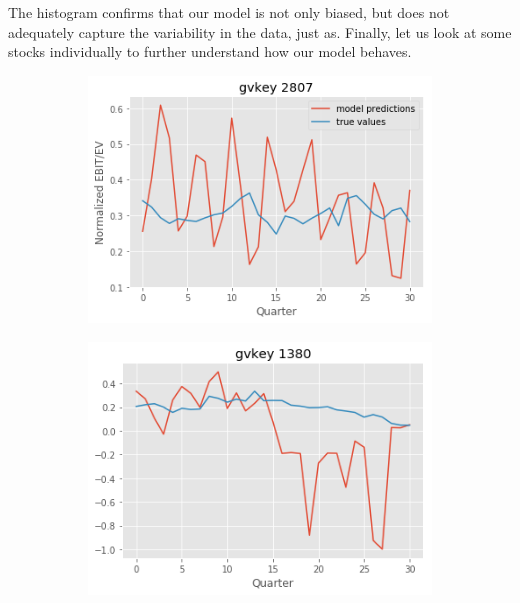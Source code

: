 \documentclass[11pt, letterpaper, headings=standardclasses]{scrartcl}
\begin{document}
    The histogram confirms that our model is not only biased, but does not adequately capture the variability in the data, just as. Finally, let us look at some stocks individually to further understand how our model behaves. 
    \begin{figure}[H]
    \centering
        \begin{subfigure}{.33\textwidth}
      \centering
      \includegraphics[width=1\linewidth]{stock1.png}
    \end{subfigure}%
    \begin{subfigure}{.33\textwidth}
      \centering
      \includegraphics[width=1\linewidth]{stock2.png}
    \end{subfigure}%
    \begin{subfigure}{.33\textwidth}

\end{subfigure}
\end{figure}
\end{document}
